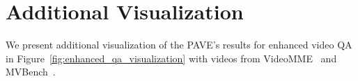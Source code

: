 \section{Additional Visualization} \label{visualization}

We present additional visualization of the PAVE's results for enhanced video QA in Figure~\ref{fig:enhanced_qa_visualization} with videos from VideoMME~\cite{fu2024video} and MVBench~\cite{li2023mvbench}. 







